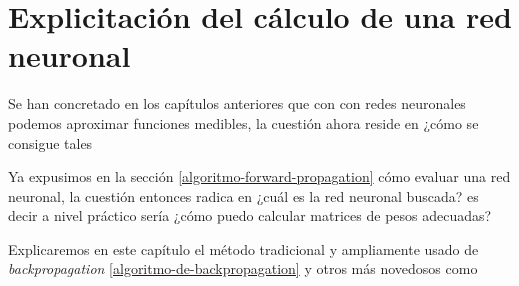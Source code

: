 %
%

\chapter{Explicitación del cálculo de una red neuronal}


Se han concretado en los capítulos anteriores que con con redes neuronales 
podemos aproximar funciones medibles, la cuestión ahora reside en ¿cómo se consigue tales 

Ya expusimos en la sección \ref{algoritmo-forward-propagation} cómo evaluar
una red neuronal, la cuestión entonces radica en ¿cuál es la red neuronal
buscada? es decir a nivel práctico sería ¿cómo puedo calcular matrices de pesos 
adecuadas?

Explicaremos en este capítulo el método tradicional y ampliamente usado de 
\textit{backpropagation} \ref{algoritmo-de-backpropagation} y otros más novedosos como

